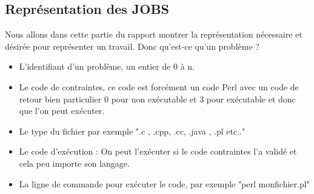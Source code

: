 \documentclass[11pt]{article}
\begin{document}
\newpage

 





\newpage
\subsection{Représentation des JOBS}
Nous allons dans cette partie du rapport montrer la représentation nécessaire et désirée pour représenter un travail. Donc qu'est-ce qu'un problème ?

\begin{itemize}
\item L'identifiant d'un problème, un entier de 0 à n.
\item Le code de contraintes, ce code est forcément un code Perl avec un code de retour bien particulier 0 pour non exécutable et 3 pour exécutable et donc que l'on peut exécuter. 
\item Le type du fichier par exemple ".c , .cpp, .cc, .java , .pl etc.."
\item Le code d'exécution : On peut l'exécuter si le code contraintes l'a validé et cela  peu importe son langage.
\item La ligne de commande pour exécuter le code, par exemple "perl monfichier.pl"
\end{itemize}

\inputminted{XML}{../Schema_XML/BDD_JOB.xsd}
\newpage 
\end{document}
